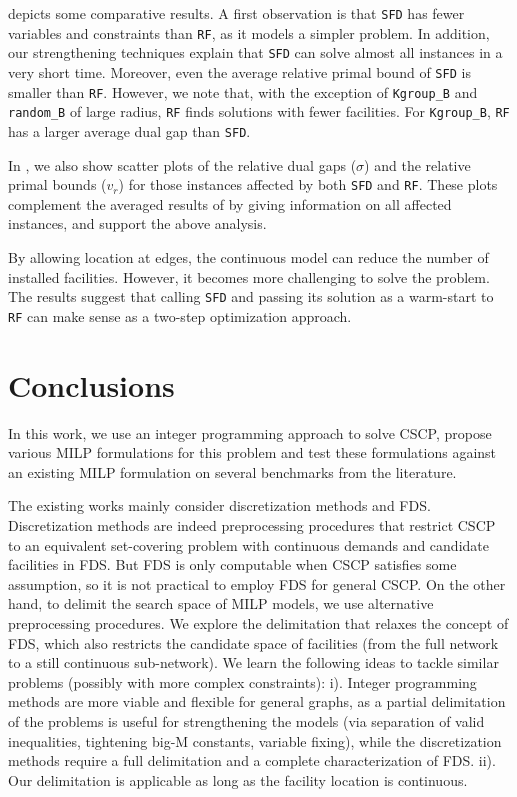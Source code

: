  depicts some comparative results. A first observation is that \texttt{SFD} has fewer variables and constraints than  \texttt{RF}, as it models a simpler problem. In addition, our strengthening techniques explain that \texttt{SFD} can solve almost all instances in a very short time. Moreover, even the average relative primal bound of \texttt{SFD} is smaller than \texttt{RF}. However, we note that, with the exception of \texttt{Kgroup\_B} and \texttt{random\_B} of large radius, \texttt{RF} finds solutions with fewer facilities.  For \texttt{Kgroup\_B}, \texttt{RF} has a larger average dual gap than \texttt{SFD}.

In , we  also show scatter plots of the relative dual gaps ($\sigma$) and the relative primal bounds ($v_r$) for those instances affected by both \texttt{SFD} and \texttt{RF}. These plots complement the averaged results of  by giving information on all affected instances, and support the above analysis.

By allowing location at edges, the continuous model can reduce the number of installed facilities. However, it becomes more challenging to solve the problem. The results suggest that calling \texttt{SFD} and passing its solution as a warm-start to \texttt{RF} can make sense as a two-step optimization approach.


\section{Conclusions}\label{sec:conclu}
In this work, we use an integer programming approach to solve CSCP,  propose various MILP formulations for this problem and test these formulations against an existing MILP formulation on several benchmarks from the literature.


The existing works mainly consider discretization methods and FDS. Discretization methods are indeed preprocessing procedures that restrict CSCP to an equivalent set-covering problem with continuous demands and candidate facilities in FDS. But FDS is only computable when CSCP satisfies some assumption, so it is not practical to employ FDS  for general CSCP. On the other hand, to delimit the search space of MILP models, we use alternative preprocessing procedures. We explore the delimitation that relaxes the concept of FDS,  which also restricts the candidate space of facilities (from the full network to a still continuous sub-network).  We learn the following ideas to tackle similar problems (possibly with more complex constraints): i). Integer programming methods are more viable and flexible for general graphs, as a partial delimitation of the problems is useful for  strengthening the models (via separation of valid inequalities, tightening big-M constants, variable fixing), while the discretization methods require a full delimitation and a complete characterization of FDS. ii). Our delimitation is applicable as long as the facility location is continuous.

